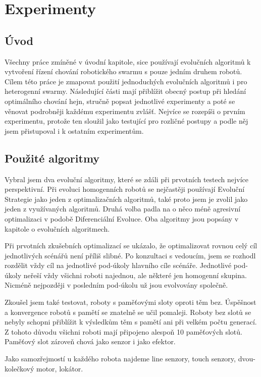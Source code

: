 \chapter{Experimenty}
\section{Úvod}
Všechny práce zmíněné v úvodní kapitole, sice používají evolučních algoritmů k vytvoření řízení chování robotického swarmu s pouze jedním druhem robotů. Cílem této práce je zmapovat použití jednoduchých evolučních algoritmů i pro heterogenní swarmy. Následující části mají přiblížit obecný postup při hledání optimálního chování hejn, stručně popsat jednotlivé experimenty a poté se věnovat podrobněji každému experimentu zvlášť. Nejvíce se rozepíši o prvním experimentu, protože ten sloužil jako testující pro rozličné postupy a podle něj jsem přistupoval i k ostatním experimentům.  

\section{Použité algoritmy}
Vybral jsem dva evoluční algoritmy, které se zdáli při prvotních testech nejvíce perspektivní. Při evoluci homogenních robotů se nejčastěji používají Evoluční Strategie jako jeden z optimalizačních algoritmů, také proto jsem je zvolil jako jeden z využívaných algoritmů. Druhá volba padla na o něco méně agresivní optimalizaci v podobě Diferenciální Evoluce. Oba algoritmy jsou popsány v kapitole o evolučních algoritmech. \par 
Při prvotních zkušebních optimalizací se ukázalo, že optimalizovat rovnou celý cíl jednotlivých scénářů není příliš slibné. Po konzultaci s vedoucím, jsem se rozhodl rozdělit vždy cíl na jednotlivé pod-úkoly hlavního cíle scénáře. Jednotlivé pod-úkoly neřeší vždy všichni roboti najednou, ale některé jen homogenní skupina. Nicméně nejpozději v posledním pod-úkolu už jsou evolvovány společně.
\par
Zkoušel jsem také testovat, roboty s paměťovými sloty oproti těm bez. Úspěšnost a konvergence robotů s pamětí se znatelně se učil pomaleji. Roboty bez slotů se nebyly schopni přiblížit k výsledkům těm s pamětí ani při velkém počtu generací. Z tohoto důvodu všichni roboti mají připojeno alespoň 10 paměťových slotů. Paměťový slot zároveň chová jako senzor i jako efektor. 
\par 
Jako samozřejmostí u každého robota najdeme line senzory, touch senzory, dvou-kolečkový motor, lokátor. \par 

